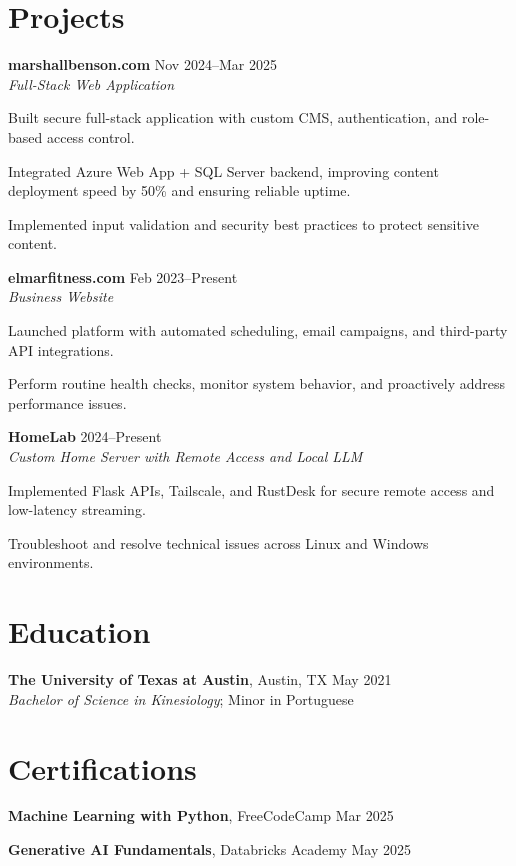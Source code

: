 \documentclass[letterpaper,10pt]{article}
\newcommand{\resumeItem}[1]{\item \small{#1}}
\begin{document}
\section*{Projects}
\begin{compactitem}
  \item[]
    \textbf{marshallbenson.com} \hfill Nov 2024–Mar 2025 \\
    \textit{Full-Stack Web Application}
    
    \begin{compactitem}[leftmargin=0.15in]
      \resumeItem{Built secure full-stack application with custom CMS, authentication, and role-based access control.}
      \resumeItem{Integrated Azure Web App + SQL Server backend, improving content deployment speed by 50\% and ensuring reliable uptime.}
      \resumeItem{Implemented input validation and security best practices to protect sensitive content.}
    \end{compactitem}

  \item[]
    \textbf{elmarfitness.com} \hfill Feb 2023–Present \\
    \textit{Business Website}
    
    \begin{compactitem}[leftmargin=0.15in]
      \resumeItem{Launched platform with automated scheduling, email campaigns, and third-party API integrations.}
      \resumeItem{Perform routine health checks, monitor system behavior, and proactively address performance issues.}
    \end{compactitem}

  \item[]
    \textbf{HomeLab} \hfill 2024–Present \\
    \textit{Custom Home Server with Remote Access and Local LLM}
    
    \begin{compactitem}[leftmargin=0.15in]
      \resumeItem{Implemented Flask APIs, Tailscale, and RustDesk for secure remote access and low-latency streaming.}
      \resumeItem{Troubleshoot and resolve technical issues across Linux and Windows environments.}
    \end{compactitem}
\end{compactitem}

\section*{Education}
\begin{compactitem}
  \item[]
    \textbf{The University of Texas at Austin}, Austin, TX \hfill May 2021 \\
    \textit{Bachelor of Science in Kinesiology}; Minor in Portuguese
\end{compactitem}

\section*{Certifications}
\begin{compactitem}
  \item[]
    \textbf{Machine Learning with Python}, FreeCodeCamp \hfill Mar 2025
  \item[]
    \textbf{Generative AI Fundamentals}, Databricks Academy \hfill May 2025
\end{compactitem}
\end{document}
